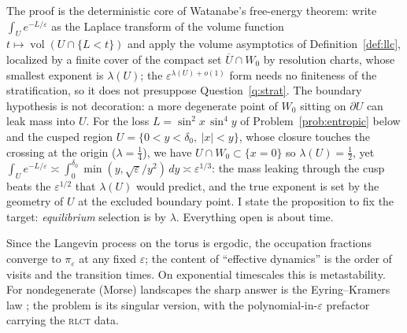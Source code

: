 \documentclass[11pt]{amsart}
\theoremstyle{plain}
\theoremstyle{definition}
\newcommand{\vol}{\operatorname{vol}}
\begin{document}
The proof is the deterministic core of Watanabe's free-energy theorem: write $\int_U e^{-L/\varepsilon}$ as the Laplace transform of the volume function $t \mapsto \vol(U \cap \{L < t\})$ and apply the volume asymptotics of Definition~\ref{def:llc}, localized by a finite cover of the compact set $\overline{U} \cap W_0$ by resolution charts, whose smallest exponent is $\lambda(U)$; the $\varepsilon^{\lambda(U) + o(1)}$ form needs no finiteness of the stratification, so it does not presuppose Question~\ref{q:strat}. The boundary hypothesis is not decoration: a more degenerate point of $W_0$ sitting on $\partial U$ can leak mass into $U$. For the loss $L = \sin^2\! x \, \sin^4\! y$ of Problem~\ref{prob:entropic} below and the cusped region $U = \{ 0 < y < \delta_0, \ |x| < y \}$, whose closure touches the crossing at the origin ($\lambda = \tfrac14$), we have $U \cap W_0 \subset \{x = 0\}$ so $\lambda(U) = \tfrac12$, yet $\int_U e^{-L/\varepsilon} \asymp \int_0^{\delta_0} \min(y, \sqrt{\varepsilon}/y^2)\, dy \asymp \varepsilon^{1/3}$: the mass leaking through the cusp beats the $\varepsilon^{1/2}$ that $\lambda(U)$ would predict, and the true exponent is set by the geometry of $U$ at the excluded boundary point. I state the proposition to fix the target: \emph{equilibrium} selection is by $\lambda$. Everything open is about time.

Since the Langevin process on the torus is ergodic, the occupation fractions converge to $\pi_\varepsilon$ at any fixed $\varepsilon$; the content of ``effective dynamics'' is the order of visits and the transition times. On exponential timescales this is metastability. For nondegenerate (Morse) landscapes the sharp answer is the Eyring--Kramers law \cite{begk2004}; the problem is its singular version, with the polynomial-in-$\varepsilon$ prefactor carrying the \textsc{rlct} data.
\end{document}
